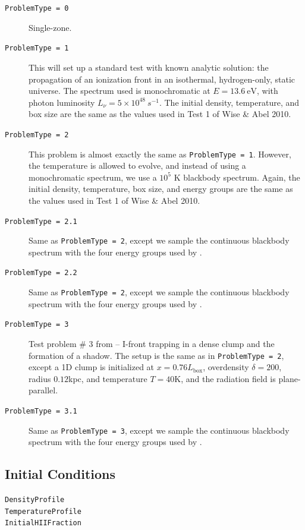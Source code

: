 \documentclass[letterpaper,titlepage,12pt]{article}
\numberwithin{equation}{section}
\begin{document}
\begin{description}
    
\item [\texttt{ProblemType = 0}] Single-zone.    
    
\item [\texttt{ProblemType = 1}] This will set up a standard test with known analytic solution: the propagation of an ionization front in an isothermal, hydrogen-only, static universe.  The spectrum used is monochromatic at $E = 13.6 \ \text{eV}$, with photon luminosity $L_{\nu} = 5\times 10^{48} \ s^{-1}$.  The initial density, temperature, and box size are the same as the values used in Test 1 of Wise \& Abel 2010. 

\item [\texttt{ProblemType = 2}] This problem is almost exactly the same as \texttt{ProblemType = 1}.  However, the temperature is allowed to evolve, and instead of using a monochromatic spectrum, we use a $10^5$ K blackbody spectrum.  Again, the initial density, temperature, box size, and energy groups are the same as the values used in Test 1 of Wise \& Abel 2010.  

\item [\texttt{ProblemType = 2.1}] Same as \texttt{ProblemType = 2}, except we sample the continuous blackbody spectrum with the four energy groups used by \citet{Wise2011}.

\item [\texttt{ProblemType = 2.2}] Same as \texttt{ProblemType = 2}, except we sample the continuous blackbody spectrum with the four energy groups used by \citet{Mirocha2012}.

\item [\texttt{ProblemType = 3}] Test problem \# 3 from \cite{Iliev2006} -- I-front trapping in a dense clump and the formation of a shadow.  The setup is the same as in \texttt{ProblemType = 2}, except a 1D clump is initialized at $x = 0.76 L_{\mathrm{box}}$, overdensity $\delta = 200$, radius $0.12$kpc, and temperature $T = 40$K, and the radiation field is plane-parallel.

\item [\texttt{ProblemType = 3.1}] Same as \texttt{ProblemType = 3}, except we sample the continuous blackbody spectrum with the four energy groups used by \citet{Wise2011}.

\end{description}

\subsection{Initial Conditions}
\begin{description}
    
\item [\texttt{DensityProfile}]  

\item [\texttt{TemperatureProfile}]

\item [\texttt{InitialHIIFraction}]  

\end{description}
\end{document}
